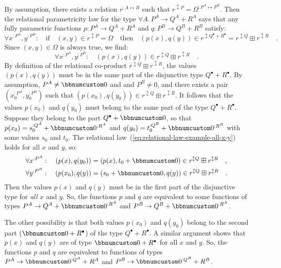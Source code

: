 By assumption, there exists a relation $r^{:A\leftrightarrow B}$
such that $r^{\updownarrow P}=\Omega^{:P^{A}\leftrightarrow P^{B}}$.
Then the relational parametricity law for the type $\forall A.\,P^{A}\rightarrow Q^{A}+R^{A}$
says that any fully parametric functions $p:P^{A}\rightarrow Q^{A}+R^{A}$
and $q:P^{B}\rightarrow Q^{B}+R^{B}$ satisfy:
\[
\forall x^{:P^{A}},y^{:P^{B}}:\quad\text{if}\quad(x,y)\in r^{\updownarrow P}=\Omega\quad\text{then}\quad(p(x),q(y))\in r^{\updownarrow Q^{\bullet}+R^{\bullet}}=r^{\updownarrow Q}\boxplus r^{\updownarrow R}\quad.
\]
Since $(x,y)\in\Omega$ is always true, we find:
\begin{equation}
\forall x^{:P^{A}},y^{:P^{B}}:\quad(p(x),q(y))\in r^{\updownarrow Q}\boxplus r^{\updownarrow R}\quad.\label{eq:relational-law-example-all-x-y}
\end{equation}
By definition of the relational co-product $r^{\updownarrow Q}\boxplus r^{\updownarrow R}$,
the values $\left(p(x),q(y)\right)$ must be in the same part of the
disjunctive type $Q^{\bullet}+R^{\bullet}$. By assumption, $P^{A}\neq\bbnum 0$
and and $P^{B}\neq0$, and there exists a pair $(x_{0}^{:P^{A}},y_{0}^{:P^{B}})$
such that $\left(p(x_{0}),q(y_{0})\right)\in r^{\updownarrow Q}\boxplus r^{\updownarrow R}$.
It follows that the values $p(x_{0})$ and $q(y_{0})$ must belong
to the same part of the type $Q^{\bullet}+R^{\bullet}$. Suppose they
belong to the part $Q^{\bullet}+\bbnum 0$, so that $p(x_{0})=s_{0}^{:Q^{A}}+\bbnum 0^{:R^{A}}$
and $q(y_{0})=t_{0}^{:Q^{B}}+\bbnum 0^{:R^{B}}$ with some values
$s_{0}$ and $t_{0}$. The relational law~(\ref{eq:relational-law-example-all-x-y})
holds for all $x$ and $y$, so: 
\begin{align*}
 & \forall x^{:P^{A}}:\quad(p(x),q(y_{0}))=(p(x),t_{0}+\bbnum 0)\in r^{\updownarrow Q}\boxplus r^{\updownarrow R}\quad,\\
 & \forall y^{:P^{B}}:\quad(p(x_{0}),q(y))=(s_{0}+\bbnum 0,q(y))\in r^{\updownarrow Q}\boxplus r^{\updownarrow R}\quad.
\end{align*}
Then the values $p(x)$ and $q(y)$ must be in the first part of the
disjunctive type for \emph{all} $x$ and $y$. So, the functions $p$
and $q$ are equivalent to some functions of types $P^{A}\rightarrow Q^{A}+\bbnum 0^{:R^{A}}$
and $P^{B}\rightarrow Q^{B}+\bbnum 0^{:R^{A}}$.

The other possibility is that both values $p(x_{0})$ and $q(y_{0})$
belong to the second part ($\bbnum 0+R^{\bullet}$) of the type $Q^{\bullet}+R^{\bullet}$.
A similar argument shows that $p(x)$ and $q(y)$ are of type $\bbnum 0+R^{\bullet}$
for all $x$ and $y$. So, the functions $p$ and $q$ are equivalent
to functions of types $P^{A}\rightarrow\bbnum 0^{:Q^{A}}+R^{A}$ and
$P^{B}\rightarrow\bbnum 0^{:Q^{B}}+R^{B}$.

